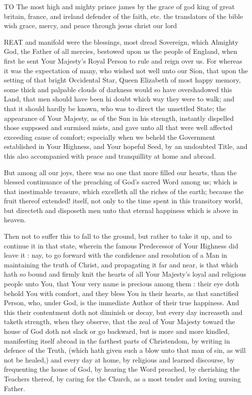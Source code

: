 TO The most high and mighty prince james
by the grace of god
king of great britain, france, and ireland
defender of the faith, etc.
the translators of the bible wish
grace, mercy, and peace
through jesus christ our lord


REAT and manifold were the blessings, most dread Sovereign, which Almighty God, the Father of all mercies, bestowed upon us the people of England, when first he sent Your Majesty's Royal Person to rule and reign over us. For whereas it was the expectation of many, who wished not well unto our Sion, that upon the setting of that bright Occidental Star, Queen Elizabeth of most happy memory, some thick and palpable clouds of darkness would so have overshadowed this Land, that men should have been hi doubt which way they were to walk; and that it should hardly be known, who was to direct the unsettled State; the appearance of Your Majesty, as of the Sun in his strength, instantly dispelled those supposed and surmised mists, and gave unto all that were well affected exceeding cause of comfort; especially when we beheld the Government established in Your Highness, and Your hopeful Seed, by an undoubted Title, and this also accompanied with peace and tranquillity at home and abroad.

But among all our joys, there was no one that more filled our hearts, than the blessed continuance of the preaching of God's sacred Word among us; which is that inestimable treasure, which excelleth all the riches of the earth; because the fruit thereof extended! itself, not only to the time spent in this transitory world, but directeth and disposeth men unto that eternal happiness which is above in heaven.

Then not to suffer this to fall to the ground, but rather to take it up, and to continue it in that state, wherein the famous Predecessor of Your Highness did leave it : nay, to go forward with the confidence and resolution of a Man in maintaining the truth of Christ, and propagating it far and near, is that which hath so bound and firmly knit the hearts of all Your Majesty's loyal and religious people unto You, that Your very name is precious among them : their eye doth behold You with comfort, and they bless You in their hearts, as that sanctified Person, who, under God, is the immediate Author of their true happiness. And this their contentment doth not diminish or decay, but every day increaseth and taketh strength, when they observe, that the zeal of Your Majesty toward the house of God doth not slack or go backward, but is more and more kindled, manifesting itself abroad in the farthest parts of Christendom, by writing in defence of the Truth, (which hath given such a blow unto that man of sin, as will not be healed,) and every day at home, by religious and learned discourse, by frequenting the house of God, by hearing the Word preached, by cherishing the Teachers thereof, by caring for the Church, as a most tender and loving nursing Father.

